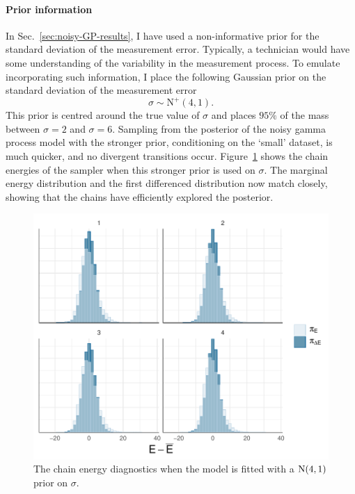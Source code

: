 \paragraph*{Prior information}

In Sec.~\ref{sec:noisy-GP-results}, I have used a non-informative prior for the standard deviation of the measurement error. Typically, a technician would have some understanding of the variability in the measurement process. To emulate incorporating such information, I place the following Gaussian prior on the standard deviation of the measurement error
\begin{equation*}
  \sigma \sim \mbox{N}^{+}(4, 1).
\end{equation*}
This prior is centred around the true value of $\sigma$ and places $95\%$ of the mass between $\sigma = 2$ and $\sigma = 6$. Sampling from the posterior of the noisy gamma process model with the stronger prior, conditioning on the `small' dataset, is much quicker, and no divergent transitions occur. Figure~\ref{fig:energies-strong-prior} shows the chain energies of the sampler when this stronger prior is used on $\sigma$. The marginal energy distribution and the first differenced distribution now match closely, showing that the chains have efficiently explored the posterior.

\begin{figure}[tbp]
  \centering
  \includegraphics[width=0.95\columnwidth]{./figures/ch-4/strong-prior-nuts-energy.pdf}
  \caption{The chain energy diagnostics when the model is fitted with a $\hbox{N}(4, 1)$ prior on $\sigma$.}
  \label{fig:energies-strong-prior}
\end{figure}

